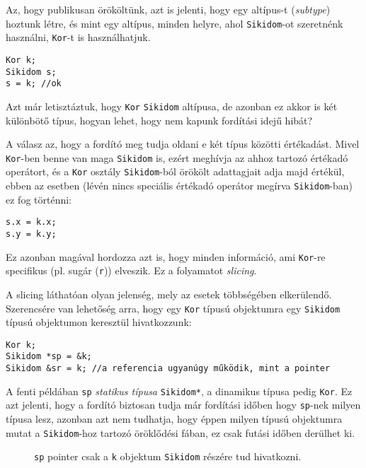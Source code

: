 \documentclass[a4paper,11.5pt,table]{article}
\begin{document}
	Az, hogy publikusan örököltünk, azt is jelenti, hogy egy {altípus}-t (\textit{subtype}) hoztunk létre, és mint egy altípus, minden helyre, ahol \texttt{Sikidom}-ot szeretnénk használni, \texttt{Kor}-t is használhatjuk. 
	\begin{lstlisting}
Kor k;
Sikidom s;
s = k; //ok
	\end{lstlisting}
	Azt már letisztáztuk, hogy \texttt{Kor} \texttt{Sikidom} altípusa, de azonban ez akkor is két különbötő típus, hogyan lehet, hogy nem kapunk fordítási idejű hibát?
	
	A válasz az, hogy a fordító meg tudja oldani e két típus közötti értékadást. Mivel \texttt{Kor}-ben benne van maga \texttt{Sikidom} is, ezért meghívja az ahhoz tartozó értékadó operátort, és a \texttt{Kor} osztály \texttt{Sikidom}-ból örökölt adattagjait adja majd értékül, ebben az esetben (lévén nincs speciális értékadó operátor megírva \texttt{Sikidom}-ban) ez fog történni:
	\begin{lstlisting}
s.x = k.x;
s.y = k.y;
	\end{lstlisting}
	Ez azonban magával hordozza azt is, hogy minden információ, ami \texttt{Kor}-re specifikus (pl. sugár (\texttt{r})) elveszik. Ez a folyamatot \textit{slicing}. 
	
	A slicing láthatóan olyan jelenség, mely az esetek többségében elkerülendő. Szerencsére van lehetőség arra, hogy egy \texttt{Kor} típusú objektumra egy \texttt{Sikidom} típusú objektumon keresztül hivatkozzunk:
	\begin{lstlisting}
Kor k;
Sikidom *sp = &k; 
Sikidom &sr = k; //a referencia ugyanúgy működik, mint a pointer
	\end{lstlisting}
	A fenti példában \texttt{sp} \textit{statikus típusa} \texttt{Sikidom*}, a dinamikus típusa pedig \texttt{Kor}. Ez azt jelenti, hogy a fordító biztosan tudja már fordítási időben hogy \texttt{sp}-nek milyen típusa lesz, azonban azt nem tudhatja, hogy éppen milyen típusú objektumra mutat a \texttt{Sikidom}-hoz tartozó öröklődési fában, ez csak futási időben derülhet ki.
	\begin{figure}[!h]
		\centering
		\smallskip
		
		\texttt{sp} pointer csak a \texttt{k} objektum \texttt{Sikidom} részére tud hivatkozni.
	\end{figure}
\end{document}
